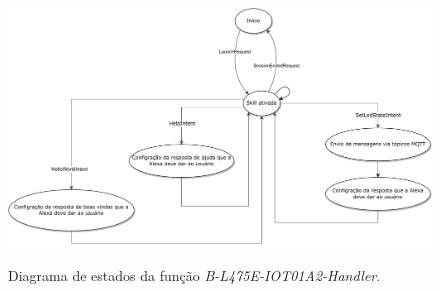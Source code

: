 \begin{figure}[htbp]
  \centering
  \caption{Diagrama de estados da função \textit{B-L475E-IOT01A2-Handler}.}
  \includegraphics[scale=0.61]{Imagens/diagrama_de_estados_bl475eiot01a2_handler.pdf}
  \label{fig:diagrama_de_estados_bl475eiot01a2_handler}
\end{figure}

